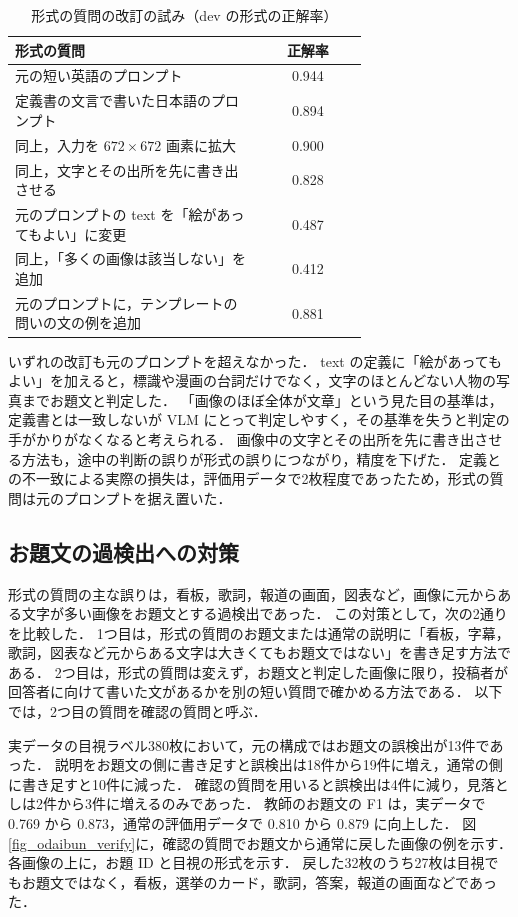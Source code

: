 \begin{table}[t]
    \centering
    \caption{形式の質問の改訂の試み（dev の形式の正解率）}
    \label{tab_format_prompt}
    \small
    \begin{tabular}{>{\raggedright\arraybackslash}p{0.7\linewidth}c}
        \toprule
        形式の質問 & 正解率 \\
        \midrule
        元の短い英語のプロンプト & 0.944 \\
        定義書の文言で書いた日本語のプロンプト & 0.894 \\
        同上，入力を $ 672 \times 672 $ 画素に拡大 & 0.900 \\
        同上，文字とその出所を先に書き出させる & 0.828 \\
        元のプロンプトの text を「絵があってもよい」に変更 & 0.487 \\
        同上，「多くの画像は該当しない」を追加 & 0.412 \\
        元のプロンプトに，テンプレートの問いの文の例を追加 & 0.881 \\
        \bottomrule
    \end{tabular}
\end{table}

いずれの改訂も元のプロンプトを超えなかった．
text の定義に「絵があってもよい」を加えると，標識や漫画の台詞だけでなく，文字のほとんどない人物の写真までお題文と判定した．
「画像のほぼ全体が文章」という見た目の基準は，定義書とは一致しないが VLM にとって判定しやすく，その基準を失うと判定の手がかりがなくなると考えられる．
画像中の文字とその出所を先に書き出させる方法も，途中の判断の誤りが形式の誤りにつながり，精度を下げた．
定義との不一致による実際の損失は，評価用データで2枚程度であったため，形式の質問は元のプロンプトを据え置いた．

\subsection{お題文の過検出への対策}
形式の質問の主な誤りは，看板，歌詞，報道の画面，図表など，画像に元からある文字が多い画像をお題文とする過検出であった．
この対策として，次の2通りを比較した．
1つ目は，形式の質問のお題文または通常の説明に「看板，字幕，歌詞，図表など元からある文字は大きくてもお題文ではない」を書き足す方法である．
2つ目は，形式の質問は変えず，お題文と判定した画像に限り，投稿者が回答者に向けて書いた文があるかを別の短い質問で確かめる方法である．
以下では，2つ目の質問を確認の質問と呼ぶ．

実データの目視ラベル380枚において，元の構成ではお題文の誤検出が13件であった．
説明をお題文の側に書き足すと誤検出は18件から19件に増え，通常の側に書き足すと10件に減った．
確認の質問を用いると誤検出は4件に減り，見落としは2件から3件に増えるのみであった．
教師のお題文の F1 は，実データで 0.769 から 0.873，通常の評価用データで 0.810 から 0.879 に向上した．
図\ref{fig_odaibun_verify}に，確認の質問でお題文から通常に戻した画像の例を示す．
各画像の上に，お題 ID と目視の形式を示す．
戻した32枚のうち27枚は目視でもお題文ではなく，看板，選挙のカード，歌詞，答案，報道の画面などであった．

